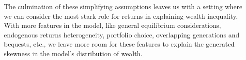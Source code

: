 \par The culmination of these simplifying assumptions leaves us with a setting where we can consider the most stark role for returns in explaining wealth inequality. With more features in the model, like general equilibrium considerations, endogenous returns heterogeneity, portfolio choice, overlapping generations and bequests, etc., we leave more room for these features to explain the generated skewness in the model's distribution of wealth. 





\par

\par